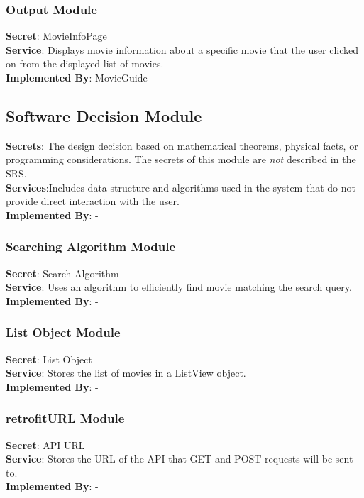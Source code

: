 \documentclass[12pt, titlepage]{article}
\begin{document}
	\subsubsection{Output Module}
	\textbf{Secret}: MovieInfoPage \\
	\textbf{Service}: Displays movie information about a specific movie that the user clicked on from the displayed list of movies. \\
	\textbf{Implemented By}: MovieGuide\\
	
	
	\subsection{Software Decision Module}
	\textbf{Secrets}: The design decision based on mathematical theorems, physical facts, or programming considerations. The secrets of this module are \emph{not} described in the SRS. \\
	\textbf{Services}:Includes data structure and algorithms used in the system that do not provide direct interaction with the user. \\
	\textbf{Implemented By}:  -\\
	\subsubsection{Searching Algorithm Module}
	\textbf{Secret}:  Search Algorithm \\
	\textbf{Service}: Uses an algorithm to efficiently find movie matching the search query. \\
	\textbf{Implemented By}: - \\
	\subsubsection{List Object Module}
	\textbf{Secret}: List Object \\
	\textbf{Service}: Stores the list of movies in a ListView object.  \\ 
	\textbf{Implemented By}: -\\
	\subsubsection{retrofitURL Module}
	\textbf{Secret}: API URL \\
	\textbf{Service}: Stores the URL of the API  that GET and POST requests will be sent to. \\ 
	\textbf{Implemented By}: -\\
\end{document}
